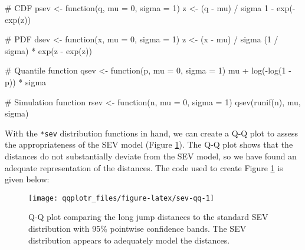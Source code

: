 \begin{Schunk}
\begin{Sinput}
# CDF
psev <- function(q, mu = 0, sigma = 1) {
  z <- (q - mu) / sigma
  1 - exp(-exp(z))
}

# PDF
dsev <- function(x, mu = 0, sigma = 1) {
  z <- (x - mu) / sigma
  (1 / sigma) * exp(z - exp(z))
}

# Quantile function
qsev <- function(p, mu = 0, sigma = 1) {
  mu + log(-log(1 - p)) * sigma
}

# Simulation function
rsev <- function(n, mu = 0, sigma = 1) {
  qsev(runif(n), mu, sigma)
}
\end{Sinput}
\end{Schunk}

With the \texttt{*sev} distribution functions in hand, we can create a
Q-Q plot to assess the appropriateness of the SEV model (Figure
\ref{fig:sev-qq}). The Q-Q plot shows that the distances do not
substantially deviate from the SEV model, so we have found an adequate
representation of the distances. The code used to create Figure
\ref{fig:sev-qq} is given below:

\begin{Schunk}
\begin{figure}

{\centering \texttt{[image: qqplotr\_files/figure-latex/sev-qq-1]} 

}

\caption[Q-Q plot comparing the long jump distances to the standard SEV distribution with 95\% pointwise confidence bands]{Q-Q plot comparing the long jump distances to the standard SEV distribution with 95\% pointwise confidence bands. The SEV distribution appears to adequately model the distances.}\label{fig:sev-qq}
\end{figure}
\end{Schunk}

\FloatBarrier

